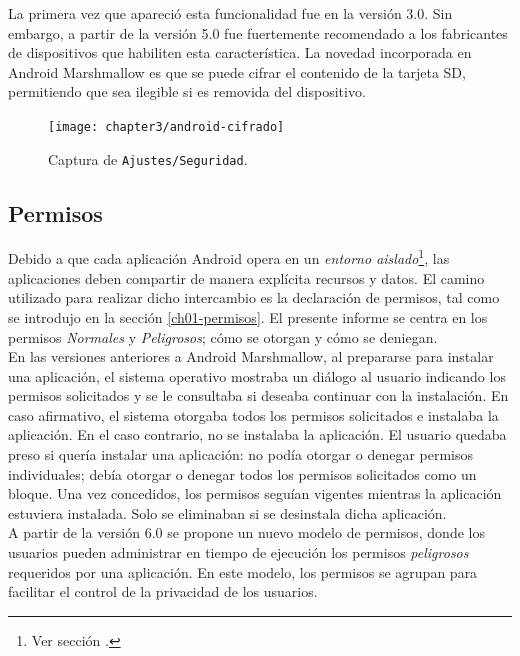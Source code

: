 La primera vez que apareció esta funcionalidad fue en la versión 3.0. Sin embargo, a partir de la versión 5.0 fue fuertemente recomendado a los fabricantes de dispositivos que habiliten esta característica. La novedad incorporada en Android Marshmallow es que se puede cifrar el contenido de la tarjeta SD, permitiendo que sea ilegible si es removida del dispositivo.
\begin{figure}[htbp]
	\begin{center}
		\texttt{[image: chapter3/android-cifrado]}
		\caption{Captura de \texttt{Ajustes/Seguridad}.}
		\label{fig:ch03:android-cifrado}
	\end{center}
\end{figure}
\subsection{Permisos}\label{ch03-permisos}
Debido a que cada aplicación Android opera en un \emph{entorno aislado}\footnote{Ver sección .}, las aplicaciones deben compartir de manera explícita recursos y datos. El camino utilizado para realizar dicho intercambio es la declaración de permisos, tal como se introdujo en la sección \ref{ch01-permisos}. El presente informe se centra en los permisos \emph{Normales} y \emph{Peligrosos}; cómo se otorgan y cómo se deniegan.\\

En las versiones anteriores a Android Marshmallow, al prepararse para instalar una aplicación, el sistema operativo mostraba un diálogo al usuario indicando los permisos solicitados y se le consultaba si deseaba continuar con la instalación. En caso afirmativo, el sistema otorgaba todos los permisos solicitados e instalaba la aplicación. En el caso contrario, no se instalaba la aplicación. El usuario quedaba preso si quería instalar una aplicación: no podía otorgar o denegar permisos individuales; debía otorgar o denegar todos los permisos solicitados como un bloque. Una vez concedidos, los permisos seguían vigentes mientras la aplicación estuviera instalada. Solo se eliminaban si se desinstala dicha aplicación.\\

A partir de la versión 6.0 se propone un nuevo modelo de permisos, donde los usuarios pueden administrar en tiempo de ejecución los permisos \emph{peligrosos} requeridos por una aplicación. En este modelo, los permisos se agrupan para facilitar el control de la privacidad de los usuarios.\\

